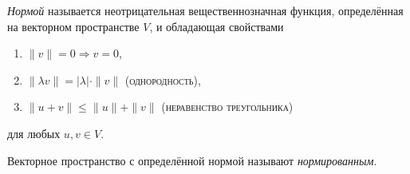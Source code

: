\begin{definition*}
  \emph{Нормой} называется неотрицательная вещественнозначная функция,
  определённая на векторном пространстве $ V $, и обладающая свойствами
  \begin{enumerate}[label=\alph*)]
    \item $ \|v\| = 0 \Rightarrow v = 0 $,
    \item $ \|\lambda v\| = |\lambda| \cdot \|v\| $ (\textsc{однородность}),
    \item $ \|u + v\| \leqslant \|u\| + \|v\| $ (\textsc{неравенство
      треугольника})
  \end{enumerate}
 для любых $ u, v \in V $.

Векторное пространство с определённой нормой называют \emph{нормированным}. 
\end{definition*}

